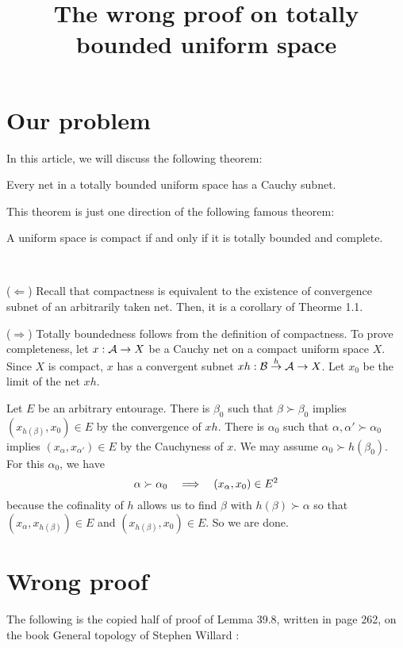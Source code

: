 \documentclass{../exp}
\title{The wrong proof on totally bounded uniform space}
\begin{document}
\maketitle
\tableofcontents

\section{Our problem}
In this article, we will discuss the following theorem:
\begin{thm}
Every net in a totally bounded uniform space has a Cauchy subnet.
\end{thm}
This theorem is just one direction of the following famous theorem:
\begin{thm}
A uniform space is compact if and only if it is totally bounded and complete.
\end{thm}
\begin{pf}\,

($\Leftarrow$)
Recall that compactness is equivalent to the existence of convergence subnet of an arbitrarily taken net.
Then, it is a corollary of Theorme 1.1.

($\Rightarrow$)
Totally boundedness follows from the definition of compactness.
To prove completeness, let $x:\cA\to X$ be a Cauchy net on a compact uniform space $X$.
Since $X$ is compact, $x$ has a convergent subnet $xh:\cB\to{h}\cA\to X$.
Let $x_0$ be the limit of the net $xh$.

Let $E$ be an arbitrary entourage.
There is $\beta_0$ such that $\beta\succ\beta_0$ implies $(x_{h(\beta)},x_0)\in E$ by the convergence of $xh$.
There is $\alpha_0$ such that $\alpha,\alpha'\succ\alpha_0$ implies $(x_\alpha,x_{\alpha'})\in E$ by the Cauchyness of $x$.
We may assume $\alpha_0\succ h(\beta_0)$.
For this $\alpha_0$, we have
\[\alpha\succ\alpha_0\impl(x_\alpha,x_0)\in E^2\]
because the cofinality of $h$ allows us to find $\beta$ with $h(\beta)\succ\alpha$ so that $(x_\alpha,x_{h(\beta)})\in E$ and $(x_{h(\beta)},x_0)\in E$.
So we are done.
\end{pf}


\section{Wrong proof}
The following is the copied half of proof of Lemma 39.8, written in page 262, on the book General topology of Stephen Willard \cite{willard2004general}:
\bigskip
\end{document}
